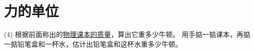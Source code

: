 \section{力的单位}\label{sec:2-3}

(4) 根据前面称出的\hyperref[celiang-keben-zhiliang]{物理课本的质量}，算出它重多少牛顿。
用手掂一掂课本，再掂一掂铅笔盒和一杯水，估计出铅笔盒和这杯水重多少牛顿。


